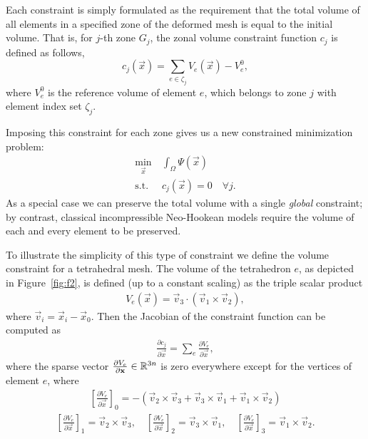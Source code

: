 Each constraint is simply formulated as the requirement that the total volume of all elements in a
specified zone of the deformed mesh is equal to the initial volume. That is, for $j$-th zone $G_j$, the zonal
volume constraint function $c_j$ is defined as follows,
\begin{equation}
c_j(\vec{x}) = \sum_{e \in \zeta_j} V_e(\vec{x}) - V_e^0,
\end{equation}
where $V_e^0$ is the reference volume of element $e$, which belongs to zone $j$ with element index set $\zeta_j$.

Imposing this constraint for each zone gives us a new constrained minimization problem:
\begin{align}
\min_{\vec{x}}\ & \int_{\Omega} \Psi(\vec{x}) \\
\text{s.t.}\ & c_j(\vec{x}) = 0 \quad \forall j.
\label{eq:constrained-min}
\end{align}
As a special case we can preserve the total volume with a single \emph{global} constraint; by
contrast, classical incompressible Neo-Hookean models require the volume of each and every element
to be preserved. 

To illustrate the simplicity of this type of constraint we define the volume constraint for a
tetrahedral mesh. The volume of the tetrahedron $e$, as depicted in Figure~\ref{fig:f2}, is defined
(up to a constant scaling) as the triple scalar product
\begin{align*}
V_e(\vec{x}) = \vec{v}_3 \cdot (\vec{v}_1 \times \vec{v}_2),
\end{align*}
where $\vec{v}_i = \vec{x}_i - \vec{x}_0$.  Then the Jacobian of the constraint function can be
computed as
\begin{align*}
\frac{\partial c_j}{\partial \vec{x}} = \sum_{e} \frac{\partial V_e}{\partial \vec{x}},
\end{align*}
where the sparse vector $\frac{\partial V_e}{\partial \mathbf{x}} \in \mathbb{R}^{3n}$ is zero everywhere
except for the vertices of element $e$, where
\begin{align*}
\left[\frac{\partial V_e}{\partial \vec{x}}\right]_0 = 
-(\vec{v}_2 \times \vec{v}_3 + \vec{v}_3 \times \vec{v}_1 + \vec{v}_1 \times
\vec{v}_2)
\end{align*}\begin{align*}
\left[\frac{\partial V_e}{\partial \vec{x}}\right]_1 = \vec{v}_2 \times \vec{v}_3, \quad
\left[\frac{\partial V_e}{\partial \vec{x}}\right]_2 = \vec{v}_3 \times \vec{v}_1, \quad
\left[\frac{\partial V_e}{\partial \vec{x}}\right]_3 = \vec{v}_1 \times \vec{v}_2.
\end{align*}

